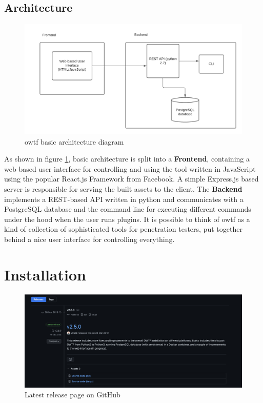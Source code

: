 \subsection{Architecture}

\begin{figure}[H]
	\centering
	\includegraphics[width=12cm,keepaspectratio=true]{pictures/architecture.png}
	\caption{
		\ac{owtf} basic architecture diagram
	}
	\label{fig:architecture}
\end{figure}

As shown in figure \ref{fig:architecture}, basic architecture is split into a \textbf{Frontend}, containing a web based user interface for controlling and using the tool written in JavaScript using the popular React.js Framework from Facebook. A simple Express.js based server is responsible for serving the built assets to the client. The \textbf{Backend} implements a REST-based API written in python and communicates with a PostgreSQL database and the command line for executing different commands under the hood when the user runs plugins. 
It is possible to think of \ac{owtf} as a kind of collection of sophisticated tools for penetration testers, put together behind a nice user interface for controlling everything.


\section{Installation}

\begin{figure}[H]
	\centering
	\includegraphics[width=12cm,keepaspectratio=true]{pictures/lastest-release.png}
	\caption{
		Latest release page on GitHub
	}
	\label{fig:lastest-release}
\end{figure}

